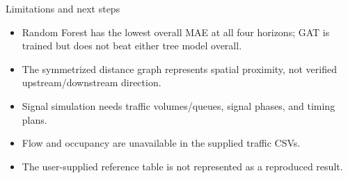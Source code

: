 \documentclass[aspectratio=169]{beamer}
\begin{document}
\begin{frame}{Limitations and next steps}
\begin{itemize}
\item Random Forest has the lowest overall MAE at all four horizons; GAT is trained but does not beat either tree model overall.
\item The symmetrized distance graph represents spatial proximity, not verified upstream/downstream direction.
\item Signal simulation needs traffic volumes/queues, signal phases, and timing plans.
\item Flow and occupancy are unavailable in the supplied traffic CSVs.
\item The user-supplied reference table is not represented as a reproduced result.
\end{itemize}
\end{frame}
\end{document}
